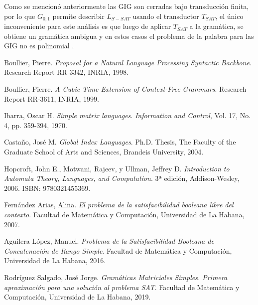 \documentclass[12pt]{article}
\begin{document}
Como se mencionó anteriormente las GIG son cerradas bajo transducción finita, por lo que $G_{0,1}$ permite describir
$L_{S-SAT}$ usando el transductor $T_{SAT}$, el único inconveniente para este análisis es que luego de aplicar $T_{SAT}$
a la gramática, se obtiene un gramática ambigua y en estos casos el problema de la palabra para las GIG no es polinomial \cite{globalIndexLanguages}.

\begin{thebibliography}{99}
    
    Boullier, Pierre.
    \textit{Proposal for a Natural Language Processing Syntactic Backbone}.
    Research Report RR-3342, INRIA, 1998.
    
    Boullier, Pierre.
    \textit{A Cubic Time Extension of Context-Free Grammars}.
    Research Report RR-3611, INRIA, 1999.
    
    Ibarra, Oscar H.
    \textit{Simple matrix languages}.
    \textit{Information and Control}, Vol. 17, No. 4, pp. 359-394, 1970.
    
    Castaño, José M.
    \textit{Global Index Languages}.
    Ph.D. Thesis, The Faculty of the Graduate School of Arts and Sciences, Brandeis University, 2004.
    
    Hopcroft, John E., Motwani, Rajeev, y Ullman, Jeffrey D.
    \textit{Introduction to Automata Theory, Languages, and Computation}.
    3ª edición, Addison-Wesley, 2006. ISBN: 9780321455369.
    
    Fernández Arias, Alina.
    \textit{El problema de la satisfacibilidad booleana libre del contexto}.
    Facultad de Matemática y Computación, Universidad de La Habana, 2007.
    
    Aguilera López, Manuel.
    \textit{Problema de la Satisfacibilidad Booleana de Concatenación de Rango Simple}.
    Facultad de Matemática y Computación, Universidad de La Habana, 2016.
    
    Rodríguez Salgado, José Jorge.
    \textit{Gramáticas Matriciales Simples. Primera aproximación para una solución al problema SAT}.
    Facultad de Matemática y Computación, Universidad de La Habana, 2019.
    
\end{thebibliography}
\end{document}
